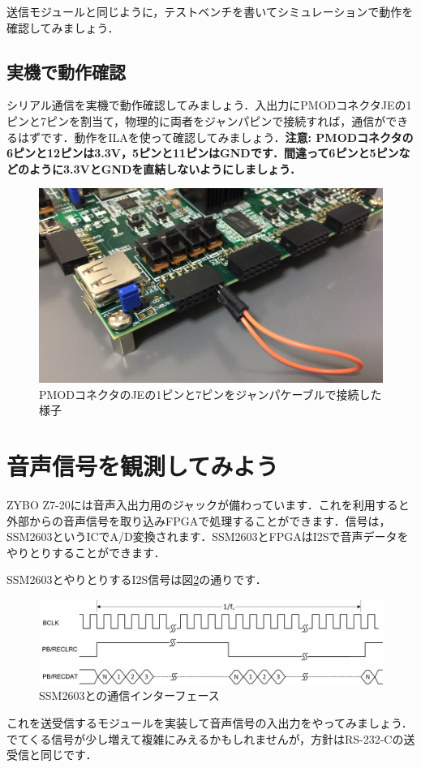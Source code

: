 \documentclass[a4paper,dvipdfmx]{jsarticle}
\begin{document}
送信モジュールと同じように，テストベンチを書いてシミュレーションで動作を確認してみましょう．

\subsection{実機で動作確認}
シリアル通信を実機で動作確認してみましょう．入出力にPMODコネクタJEの1ピンと7ピンを割当て，物理的に両者をジャンパピンで接続すれば，通信ができるはずです．動作をILAを使って確認してみましょう．{\bf 注意: PMODコネクタの6ピンと12ピンは3.3V，5ピンと11ピンはGNDです．間違って6ピンと5ピンなどのように3.3VとGNDを直結しないようにしましょう．}

 \begin{figure}[H]
  \begin{center}
   \includegraphics[width=.6\textwidth]{chapter06_figures/IMG_0007.JPG}
  \end{center}
  \label{fig:serial_comm_test}
  \caption{PMODコネクタのJEの1ピンと7ピンをジャンパケーブルで接続した様子}
 \end{figure}

\section{音声信号を観測してみよう}\label{sec:ssm2603_input}

ZYBO Z7-20には音声入出力用のジャックが備わっています．これを利用すると外部からの音声信号を取り込みFPGAで処理することができます．信号は，SSM2603というICでA/D変換されます．SSM2603とFPGAはI2Sで音声データをやりとりすることができます．

SSM2603とやりとりするI2S信号は図\ref{fig:ssm2603_protocol}の通りです．
 \begin{figure}[H]
  \begin{center}
   \includegraphics[width=.8\textwidth]{chapter06_figures/zybo-z7-audio.png}
  \end{center}
  \label{fig:ssm2603_protocol}
  \caption{SSM2603との通信インターフェース}
 \end{figure}
これを送受信するモジュールを実装して音声信号の入出力をやってみましょう．
でてくる信号が少し増えて複雑にみえるかもしれませんが，方針はRS-232-Cの送受信と同じです．
\end{document}
